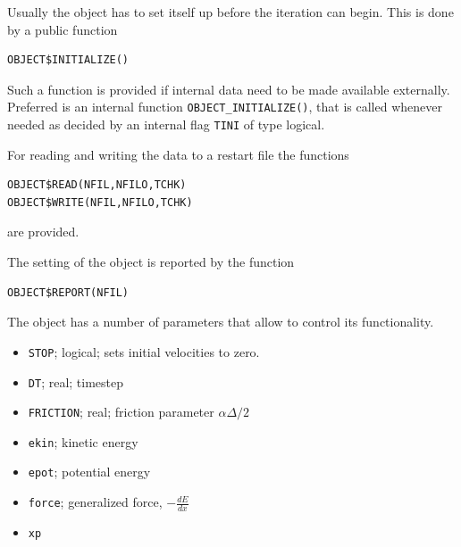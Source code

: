 \documentclass[a4paper,10pt]{report}
\begin{document}
Usually the object has to set itself up before the iteration can
begin. This is done by a public function
\begin{verbatim}
OBJECT$INITIALIZE()
\end{verbatim}
Such a function is provided if internal data need to be made available
externally. Preferred is an internal function
\texttt{OBJECT\_INITIALIZE()}, that is called whenever needed as
decided by an internal flag \texttt{TINI} of type logical.

For reading and writing the data to a restart file the functions
\begin{verbatim}
OBJECT$READ(NFIL,NFILO,TCHK)
OBJECT$WRITE(NFIL,NFILO,TCHK)
\end{verbatim}
are provided.

The setting of the object is reported by the function
\begin{verbatim}
OBJECT$REPORT(NFIL)
\end{verbatim}

The object has a number of parameters that allow to control its
functionality.
\begin{itemize}
\item \texttt{STOP}; logical; sets initial velocities to zero.
\item \texttt{DT}; real; timestep
\item \texttt{FRICTION}; real; friction parameter $\alpha\Delta/2$
\end{itemize}   

\begin{itemize}
\item \texttt{ekin}; kinetic energy
\item \texttt{epot}; potential energy
\item \texttt{force}; generalized force, $-\frac{dE}{dx}$
\item \texttt{xp}
\end{itemize}   

\printindex
\end{document}
